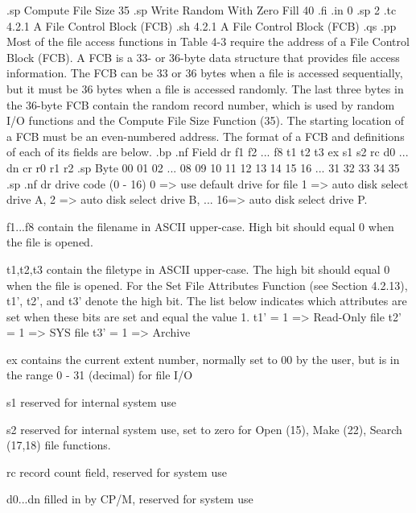 .sp
               Compute File Size          35
.sp
               Write Random With
               Zero Fill                  40
.fi
.in 0
.sp 2
.tc         4.2.1  A File Control Block (FCB)
.sh
4.2.1  A File Control Block (FCB)
.qs
.pp
Most of the file access functions in Table 4-3 require the
address of a File Control Block (FCB).  A FCB is a 33- or 36-byte
data structure that provides file access information. The FCB can
be 33 or 36 bytes when a file is accessed sequentially, but it must be
36 bytes when a file is accessed randomly.  The last three bytes
in the 36-byte FCB contain the random record number, which is
used by random I/O functions and the Compute File Size Function
(35). The starting location of a FCB must be an even-numbered
address.  The format of a FCB and definitions of each of its
fields are below.
.bp
.nf
Field     dr f1 f2 ... f8 t1 t2 t3 ex s1 s2 rc d0 ... dn cr r0 r1 r2
.sp
Byte      00 01 02 ... 08 09 10 11 12 13 14 15 16 ... 31 32 33 34 35
.sp
.nf
   dr        drive code (0 - 16)
             0 => use default drive for file
             1 => auto disk select drive A,
             2 => auto disk select drive B,
             ...
             16=> auto disk select drive P.

   f1...f8   contain the filename in ASCII
             upper-case. High bit should equal 0
             when the file is opened. 

   t1,t2,t3  contain the filetype in ASCII
             upper-case. The high bit should equal 0
             when the file is opened. For the Set File
             Attributes Function (see Section 4.2.13),             
             t1', t2', and t3' denote the high bit.  The
             list below indicates which attributes are set
             when these bits are set and equal the value 1.
             t1' = 1 => Read-Only file
             t2' = 1 => SYS file 
             t3' = 1 => Archive

    ex       contains the current extent number,
             normally set to 00 by the user, but is in the
             range 0 - 31 (decimal) for file I/O

    s1       reserved for internal system use

    s2       reserved for internal system use, set to zero for
             Open (15), Make (22), Search (17,18) file functions.

    rc       record count field, reserved for system use

    d0...dn  filled in by CP/M, reserved for
             system use

